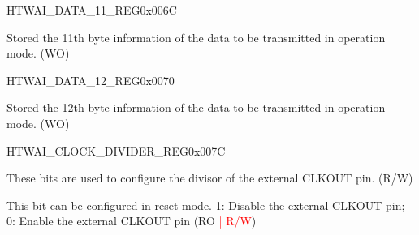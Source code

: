 \begin{register}{H}{TWAI\_DATA\_11\_REG}{0x006C}\label{regdesc:TWAIDATA11REG}
%
%
\regnewline%
\begin{regdesc}\begin{reglist}
\label{fielddesc:TWAITXBYTE11}\item [TWAI\_TX\_BYTE\_11] Stored the 11th byte information of the data to be transmitted in operation mode. (WO)
\end{reglist}\end{regdesc}
\end{register}


\begin{register}{H}{TWAI\_DATA\_12\_REG}{0x0070}\label{regdesc:TWAIDATA12REG}
%
%
\regnewline%
\begin{regdesc}\begin{reglist}
\label{fielddesc:TWAITXBYTE12}\item [TWAI\_TX\_BYTE\_12] Stored the 12th byte information of the data to be transmitted in operation mode. (WO)
\end{reglist}\end{regdesc}
\end{register}


\begin{register}{H}{TWAI\_CLOCK\_DIVIDER\_REG}{0x007C}\label{regdesc:TWAICLOCKDIVIDERREG}
%
%
%
\regnewline%
\begin{regdesc}\begin{reglist}
\label{fielddesc:TWAICD}\item [TWAI\_CD] These bits are used to configure the divisor of the external CLKOUT pin. (R/W)
\label{fielddesc:TWAICLOCKOFF}\item [TWAI\_CLOCK\_OFF] This bit can be configured in reset mode. 1: Disable the external CLKOUT pin; 0: Enable the external CLKOUT pin (RO \textcolor{red}{| R/W})
\end{reglist}\end{regdesc}
\end{register}


